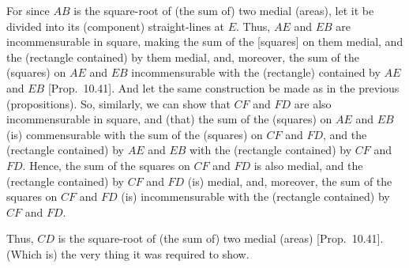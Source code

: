 \begin{Parallel}{}{}
{For since $AB$ is the square-root of (the sum of) two medial (areas),
let it be divided into its (component) straight-lines at $E$.
Thus, $AE$ and $EB$ are incommensurable in square, making the sum of
the [squares] on them medial, and the (rectangle contained) by them
medial, and, moreover, the sum of the (squares) on $AE$ and $EB$
incommensurable with the (rectangle) contained by $AE$ and $EB$ [Prop.~10.41]. And let the same construction
be made as in the previous (propositions). So, similarly, we
can show that $CF$ and $FD$ are also incommensurable in square,
and (that) the sum of the (squares) on $AE$ and $EB$ (is)
commensurable with the sum of the (squares) on $CF$ and $FD$, and the
(rectangle contained) by $AE$ and $EB$ with the (rectangle contained)
by $CF$ and $FD$. Hence, the sum of the squares on $CF$ and
$FD$ is also medial, and the (rectangle contained) by $CF$ and $FD$
(is) medial, and, moreover, the sum of the squares on $CF$ and $FD$
(is) incommensurable with the (rectangle contained) by $CF$ and $FD$.

Thus, $CD$ is the square-root of (the sum of) two medial (areas) [Prop.~10.41].
(Which is) the very thing it was required to show.}
\end{Parallel}

